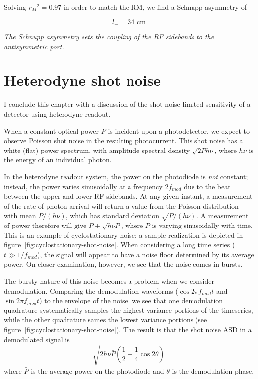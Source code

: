 Solving $r_{M}{}^{2}=0.97$ in order to match the RM, we find a Schnupp
asymmetry of

\begin{equation}
l_{-}=34\text{\ cm}
\end{equation}

\emph{The Schnupp asymmetry sets the coupling of the RF sidebands to the
antisymmetric port.}

\section{Heterodyne shot noise}

I conclude this chapter with a discussion of the shot-noise-limited
sensitivity of a detector using heterodyne readout.

When a constant optical power $P$ is incident upon a photodetector, we
expect to observe Poisson shot noise in the resulting photocurrent.
This shot noise has a white (flat) power spectrum, with amplitude
spectral density $\sqrt{2 P h \nu}$, where $h\nu$ is the energy of an
individual photon.

In the heterodyne readout system, the power on the photodiode is
\emph{not} constant; instead, the power varies sinusoidally at a
frequency $2f_{mod}$ due to the beat between the upper and lower RF
sidebands.  At any given instant, a measurement of the rate of photon
arrival will return a value from the Poisson distribution with mean
$P/(h\nu)$, which has standard deviation $\sqrt{P/(h\nu)}$.  A
measurement of power therefore will give $P\pm\sqrt{h\nu P}$, where
$P$ is varying sinusoidally with time.  This is an example of
cyclostationary noise; a sample realization is depicted in
figure~\ref{fig:cyclostationary-shot-noise}.  When considering a long
time series ($t\gg1/f_{mod}$), the signal will appear to have a noise
floor determined by its average power.  On closer examination,
however, we see that the noise comes in bursts.

The bursty nature of this noise becomes a problem when we consider
demodulation.  Comparing the demodulation waveforms ($\cos 2\pi
f_{mod} t$ and $\sin 2\pi f_{mod} t$) to the envelope of the noise, we
see that one demodulation quadrature systematically samples the
highest variance portions of the timeseries, while the other
quadrature sames the lowest variance portions (see
figure~\ref{fig:cyclostationary-shot-noise}).  The
result\cite{Niebauer1991Nonstationary} is that the shot noise ASD in a
demodulated signal is
\begin{equation}
\sqrt{2h\nu\bar{P} \left( \frac{1}{2}-\frac{1}{4}\cos2\theta\right)}
\end{equation}
where $\bar{P}$ is the average power on the photodiode and $\theta$ is
the demodulation phase.

